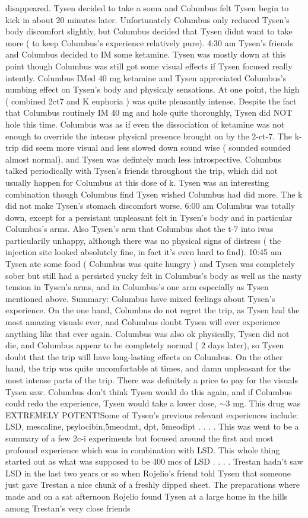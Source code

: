 \documentclass[12pt]{book}
\begin{document}
disappeared. Tysen decided to take a soma and Columbus felt Tysen begin to kick in about 20 minutes later. Unfortunately Columbus only reduced Tysen's body discomfort slightly, but Columbus decided that Tysen didnt want to take more ( to keep Columbus's experience relatively pure). 4:30 am Tysen's friends and Columbus decided to IM some ketamine. Tysen was mostly down at this point though Columbus was still got some visual effects if Tysen focused really intently. Columbus IMed 40 mg ketamine and Tysen appreciated Columbus's numbing effect on Tysen's body and physicaly sensations. At one point, the high ( combined 2ct7 and K euphoria ) was quite pleasantly intense. Despite the fact that Columbus routinely IM 40 mg and hole quite thoroughly, Tysen did NOT hole this time. Columbus was as if even the dissociation of ketamine was not enough to override the intense physical presence brought on by the 2-ct-7. The k-trip did seem more visual and less slowed down sound wise ( sounded sounded almost normal), and Tysen was defintely much less introspective. Columbus talked periodically with Tysen's friends throughout the trip, which did not usually happen for Columbus at this dose of k. Tysen was an interesting combination though Columbus find Tysen wished Columbus had did more. The k did not make Tysen's stomach discomfort worse. 6:00 am Columbus was totally down, except for a persistant unpleasant felt in Tysen's body and in particular Columbus's arms. Also Tysen's arm that Columbus shot the t-7 into iwas particularily unhappy, although there was no physical signs of distress ( the injection site looked absolutely fine, in fact it's even hard to find). 10:45 am Tysen ate some food ( Columbus was quite hungry ) and Tysen was completely sober but still had a persisted yucky felt in Columbus's body as well as the nasty tension in Tysen's arms, and in Columbus's one arm especially as Tysen mentioned above. Summary: Columbus have mixed feelings about Tysen's experience. On the one hand, Columbus do not regret the trip, as Tysen had the most amazing visuals ever, and Columbus doubt Tysen will ever experience anything like that ever again. Columbus was also ok physically, Tysen did not die, and Columbus appear to be completely normal ( 2 days later), so Tysen doubt that the trip will have long-lasting effects on Columbus. On the other hand, the trip was quite uncomfortable at times, and damn unpleasant for the most intense parts of the trip. There was definitely a price to pay for the visuals Tysen saw. Columbus don't think Tysen would do this again, and if Columbus could redo the experience, Tysen would take a lower dose, $\sim$3 mg. This drug was EXTREMELY POTENT!Some of Tysen's previous relevant experiences include: LSD, mescaline, psylocibin,5meodmt, dpt, 5meodipt  . . .  . This was went to be a summary of a few 2c-i experiments but focused around the first and most profound experience which was in combination with LSD. This whole thing started out as what was supposed to be 400 mcs of LSD  . . .  . Trestan hadn't saw LSD in the last two years or so when Rojelio's friend told Tysen that someone just gave Trestan a nice chunk of a freshly dipped sheet. The preparations where made and on a sat afternoon Rojelio found Tysen at a large home in the hills among Trestan's very close friends 
\end{document}
